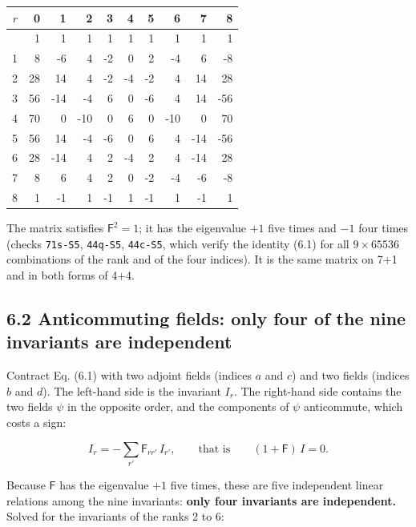 \documentclass[
  10pt,
]{article}
\begin{document}
\begin{longtable}[]{@{}rrrrrrrrrr@{}}
\toprule\noalign{}
\(r\) & 0 & 1 & 2 & 3 & 4 & 5 & 6 & 7 & 8 \\
\midrule\noalign{}
\endhead
\bottomrule\noalign{}
\endlastfoot
0 & 1 & 1 & 1 & 1 & 1 & 1 & 1 & 1 & 1 \\
1 & 8 & -6 & 4 & -2 & 0 & 2 & -4 & 6 & -8 \\
2 & 28 & 14 & 4 & -2 & -4 & -2 & 4 & 14 & 28 \\
3 & 56 & -14 & -4 & 6 & 0 & -6 & 4 & 14 & -56 \\
4 & 70 & 0 & -10 & 0 & 6 & 0 & -10 & 0 & 70 \\
5 & 56 & 14 & -4 & -6 & 0 & 6 & 4 & -14 & -56 \\
6 & 28 & -14 & 4 & 2 & -4 & 2 & 4 & -14 & 28 \\
7 & 8 & 6 & 4 & 2 & 0 & -2 & -4 & -6 & -8 \\
8 & 1 & -1 & 1 & -1 & 1 & -1 & 1 & -1 & 1 \\
\end{longtable}

The matrix satisfies \(\mathsf F^2=1\); it has the eigenvalue \(+1\)
five times and \(-1\) four times (checks \texttt{71s-S5},
\texttt{44q-S5}, \texttt{44c-S5}, which verify the identity (6.1) for
all \(9\times65536\) combinations of the rank and of the four indices).
It is the same matrix on 7+1 and in both forms of 4+4.

\hypertarget{anticommuting-fields-only-four-of-the-nine-invariants-are-independent}{%
\subsection{6.2 Anticommuting fields: only four of the nine invariants
are
independent}\label{anticommuting-fields-only-four-of-the-nine-invariants-are-independent}}

Contract Eq. (6.1) with two adjoint fields (indices \(a\) and \(c\)) and
two fields (indices \(b\) and \(d\)). The left-hand side is the
invariant \(I_r\). The right-hand side contains the two fields \(\psi\)
in the opposite order, and the components of \(\psi\) anticommute, which
costs a sign:

\[I_r=-\sum_{r'}\mathsf F_{rr'}\,I_{r'},\qquad\text{that is}\qquad(1+\mathsf F)\,I=0.\tag{6.2}\]

Because \(\mathsf F\) has the eigenvalue \(+1\) five times, these are
five independent linear relations among the nine invariants:
\textbf{only four invariants are independent.} Solved for the invariants
of the ranks 2 to 6:
\end{document}
